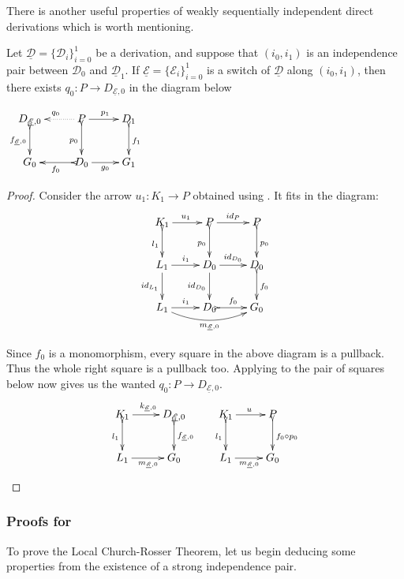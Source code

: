 \documentclass[a4paper,UKenglish,cleveref,pdftex,thm-restate,numberwithinsect,anonymous]{lipics}
\newcommand{\id}[1]{\mathsf{id}_{#1}}
\newcommand{\dder}[1]{\mathscr{#1}}
\newcommand{\der}[1]{\underline{\dder{#1}}}
\begin{document}
There is another
useful properties of weakly sequentially independent direct
derivations which is worth mentioning.

\noindent
\parbox{9.5cm}
{\begin{proposition}\label{lem:cose}Let
    $\der{D}=\{\dder{D}_i\}_{i=0}^1$ be a derivation, and suppose
    that $(i_0, i_1)$ is an independence pair between $\dder{D}_0$
    and $\der{D}_1$.  If $\der{E}=\{\dder{E}_i\}_{i=0}^1$ is a
    switch of $\der{D}$ along $(i_0, i_1)$, then there exists
    $q_0\colon P\to D_{\der{E},0}$ in the diagram
    below \end{proposition}}
\parbox{4cm}{$\xymatrix{D_{\der{E},0} \ar@{>->}[d]_{f_{\der{E},0}}&P
    \ar@{.>}[l]_{q_0} \ar[r]^{p_1} \ar@{>->}[d]_{p_0}& D_1
    \ar@{>->}[d]^{f_1}\\ G_{0}&D_0 \ar@{>->}[l]^{f_0}\ar[r]_{g_0}&
    G_1}$}

\begin{proof}
  Consider the arrow $u_1\colon K_1\to P$ obtained using
  . It fits in the diagram:
\[		\xymatrix{K_1 \ar[r]^{u_1} \ar@{>->}[d]_{l_1}&P
	\ar[r]^{\id{P}}\ar@{>->}[d]_{p_0}& P\ar@{>->}[d]^{p_0}\\L_1
	\ar[d]_{\id{L_1}}\ar[r]^{i_1}&D_0 \ar[r]^{\id{D_0}}
	\ar[d]_{\id{D_0}}& D_{0} \ar@{>->}[d]^{f_0}\\
	L_1\ar[r]^{i_1} \ar@/_.4cm/[rr]_{m_{\der{E},0}}&D_0
	\ar@{>->}[r]^{f_0}&G_0}\]

  Since $f_0$ is a monomorphism, every square in the above diagram
  is a pullback. Thus the whole right square is a pullback too.
  Applying  to the pair of squares below now gives
  us the wanted $q_0\colon P\to D_{\der{E},0}$.
  \[	\xymatrix{K_1 \ar@{>->}[d]_{l_1}\ar[r]^{k_{\der{E},0}}&
  	D_{\der{E},0} \ar@{>->}[d]^{f_{\der{E},0}} & K_1 \ar[r]^{u}
  	\ar@{>->}[d]_{l_1}& P \ar@{>->}[d]^{f_0\circ
  		p_0}\\L_1\ar[r]_{m_{\der{E},0}}&G_0 &L_1
  	\ar[r]_{m_{\der{E},0}}&G_0} \]
\end{proof}


\subsubsection{Proofs for }

To prove the Local Church-Rosser Theorem, let us begin deducing some properties from the existence of a strong independence pair. 
\end{document}
